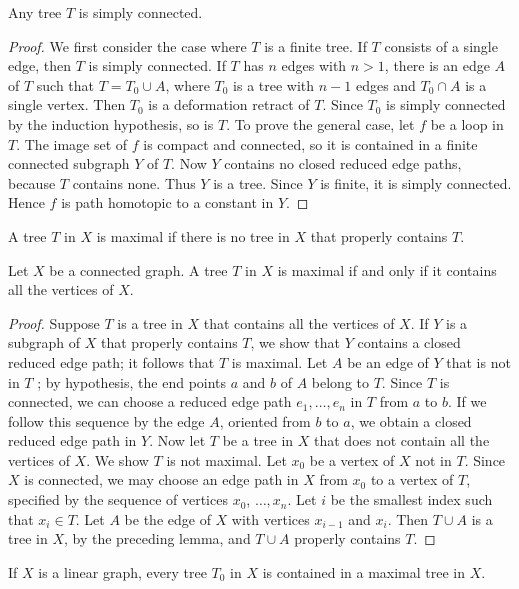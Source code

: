 \begin{theorem}
\label{thm:\thetheorem}
	Any tree \(T\) is simply connected.
\end{theorem}

\begin{proof}
	We first consider the case where \(T\) is a finite tree. If \(T\) consists of a single edge, then \(T\) is simply connected. If \(T\) has \(n\) edges with \(n > 1\), there is an edge \(A\) of \(T\) such that \(T = T_{0} \cup A\), where \(T_{0}\) is a tree with \(n - 1\) edges and \(T_{0} \cap A\) is a single vertex. Then \(T_{0}\) is a deformation retract of \(T\). Since \(T_{0}\) is simply connected by the induction hypothesis, so is \(T\).
To prove the general case, let \(f\) be a loop in \(T\). The image set of \(f\) is compact and connected, so it is contained in a finite connected subgraph \(Y\) of \(T\). Now \(Y\) contains no closed reduced edge paths, because \(T\) contains none. Thus \(Y\) is a tree. Since \(Y\) is finite, it is simply connected. Hence \(f\) is path homotopic to a constant in \(Y\).
\end{proof}
\begin{definition}
	A tree \(T\) in \(X\) is maximal if there is no tree in \(X\) that properly contains \(T\).
\end{definition}

\begin{theorem}
\label{thm:\thetheorem}
	Let \(X\) be a connected graph. A tree \(T\) in \(X\) is maximal if and only if it contains all the vertices of \(X\).
\end{theorem}

\begin{proof}
	Suppose \(T\) is a tree in \(X\) that contains all the vertices of \(X\). If \(Y\) is a subgraph of \(X\) that properly contains \(T\), we show that \(Y\) contains a closed reduced edge path; it follows that \(T\) is maximal. Let \(A\) be an edge of \(Y\) that is not in \(T\) ; by hypothesis, the end points \(a\) and \(b\) of \(A\) belong to \(T\). Since \(T\) is connected, we can choose a reduced edge path \(e_{1},\ldots ,e_{n}\) in \(T\) from \(a\) to \(b\). If we follow this sequence by the edge \(A\), oriented from \(b\) to \(a\), we obtain a closed reduced edge path in \(Y\).
Now let \(T\) be a tree in \(X\) that does not contain all the vertices of \(X\). We show \(T\) is not maximal. Let \(x_{0}\) be a vertex of \(X\) not in \(T\). Since \(X\) is connected, we may choose an edge path in \(X\) from \(x_{0}\) to a vertex of \(T\), specified by the sequence of vertices \(x_{0}\), \(\ldots ,x_{n}\). Let \(i\) be the smallest index such that \(x_{i} \in T\). Let \(A\) be the edge of \(X\) with vertices \(x_{i - 1}\) and \(x_{i}\). Then \(T \cup A\) is a tree in \(X\), by the preceding lemma, and \(T \cup A\) properly contains \(T\).
\end{proof}
\begin{theorem}
\label{thm:\thetheorem}
	If \(X\) is a linear graph, every tree \(T_{0}\) in \(X\) is contained in a maximal tree in \(X\).
\end{theorem}

